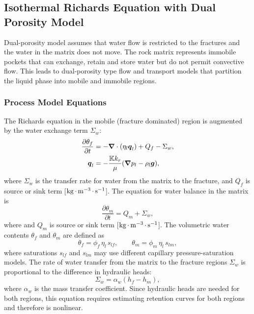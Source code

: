 \subsection{Isothermal Richards Equation with Dual Porosity Model}
\label{sec:dual-porosity-richards-equation}

Dual-porosity model assumes that water flow is restricted to the fractures and the
water in the matrix does not move.
The rock matrix represents immobile pockets that can exchange, retain and store water
but do not permit convective flow.
This leads to dual-porosity type flow and transport models that partition the liquid
phase into mobile and immobile regions.


\subsubsection{Process Model Equations} 

The Richards equation in the mobile (fracture dominated) region is augmented by the water exchange
term $\Sigma_w$: 
\begin{subequations}
\begin{align}
  \frac{\partial \theta_f}{\partial t} 
  &= 
  -{\boldsymbol{\nabla}} \cdot (\eta_l {\boldsymbol{q}}_l) + Q_f - \Sigma_w, 
  \\
  {\boldsymbol{q}}_l 
  &= 
  -\frac{{\mathbb K} k_r}{\mu} ({\boldsymbol{\nabla}} p_l - \rho_l {\boldsymbol{g}}),
\end{align}
\end{subequations}
where $\Sigma_w$ is the transfer rate for water from the matrix to the fracture, 
and $Q_f$ is source or sink term [${\rm kg} {\,\cdot\,} {\rm m}^{-3} {\,\cdot\,} {\rm s}^{-1}$].
The equation for water balance in the matrix is
$$
  \frac{\partial \theta_m}{\partial t} 
  = Q_m + \Sigma_w,
$$
where and $Q_m$ is source or sink term [${\rm kg} {\,\cdot\,} {\rm m}^{-3} {\,\cdot\,} {\rm s}^{-1}$].
The volumetric water contents $\theta_f$ and $\theta_m$ are defined as
$$
  \theta_f = \phi_f\, \eta_l\, s_{lf},\qquad
  \theta_m = \phi_m\, \eta_l\, s_{lm},
$$
where saturations $s_{lf}$ and $s_{lm}$ may use different 
capillary pressure-saturation models.
The rate of water transfer from the matrix to the fracture regions $\Sigma_w$ 
is proportional to the difference in hydraulic heads:
$$
  \Sigma_w = \alpha_w (h_f - h_m),
$$
where $\alpha_w$ is the mass transfer coefficient.
Since hydraulic heads are needed for both regions, this equation requires
estimating retention curves for both regions and therefore is nonlinear.


